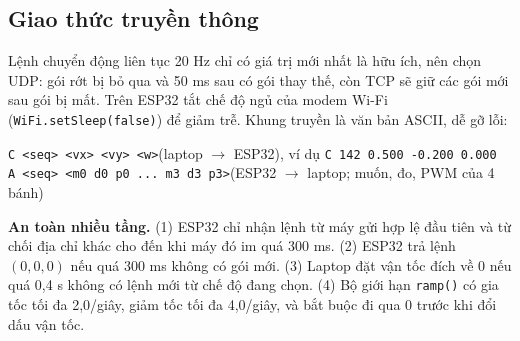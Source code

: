 \documentclass[11pt,a4paper]{article}
\newcommand{\code}[1]{\texttt{\small #1}}
\begin{document}
\subsection{Giao thức truyền thông}
Lệnh chuyển động liên tục 20 Hz chỉ có giá trị mới nhất là hữu ích, nên chọn UDP: gói rớt bị bỏ qua và 50 ms sau có gói thay thế, còn TCP sẽ giữ các gói mới sau gói bị mất. Trên ESP32 tắt chế độ ngủ của modem Wi-Fi (\code{WiFi.setSleep(false)}) để giảm trễ. Khung truyền là văn bản ASCII, dễ gỡ lỗi:
\begin{center}\small
\code{C <seq> <vx> <vy> <w>}\quad (laptop $\to$ ESP32), ví dụ \code{C 142 0.500 -0.200 0.000}\\
\code{A <seq> <m0 d0 p0 ... m3 d3 p3>}\quad (ESP32 $\to$ laptop; muốn, đo, PWM của 4 bánh)
\end{center}
\textbf{An toàn nhiều tầng.} (1) ESP32 chỉ nhận lệnh từ máy gửi hợp lệ đầu tiên và từ chối địa chỉ khác cho đến khi máy đó im quá 300 ms. (2) ESP32 trả lệnh $(0,0,0)$ nếu quá 300 ms không có gói mới. (3) Laptop đặt vận tốc đích về 0 nếu quá 0,4 s không có lệnh mới từ chế độ đang chọn. (4) Bộ giới hạn \code{ramp()} có gia tốc tối đa 2,0/giây, giảm tốc tối đa 4,0/giây, và bắt buộc đi qua 0 trước khi đổi dấu vận tốc.
\end{document}
